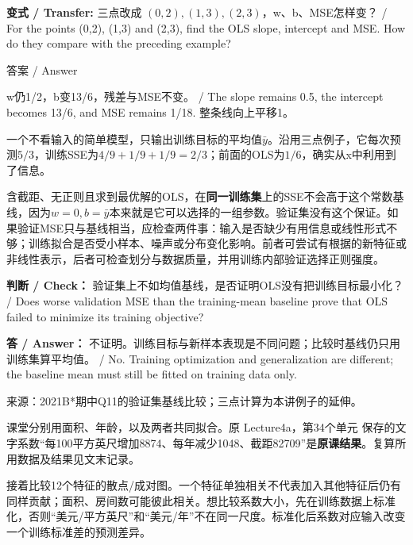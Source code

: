 \textbf{变式 / Transfer:} 三点改成 \((0,2),(1,3),(2,3)\)，w、b、MSE怎样变？ / For the points (0,2), (1,3) and (2,3), find the OLS slope, intercept and MSE. How do they compare with the preceding example?



\begin{StudySolution}{答案 / Answer}


w仍1/2，b变13/6，残差与MSE不变。 / The slope remains 0.5, the intercept becomes 13/6, and MSE remains 1/18. 整条线向上平移1。


\end{StudySolution}





一个不看输入的简单模型，只输出训练目标的平均值\(\bar y\)。沿用三点例子，它每次预测\(5/3\)，训练SSE为\(4/9+1/9+1/9=2/3\)；前面的OLS为\(1/6\)，确实从x中利用到了信息。


含截距、无正则且求到最优解的OLS，在\textbf{同一训练集}上的SSE不会高于这个常数基线，因为\(w=0,b=\bar y\)本来就是它可以选择的一组参数。验证集没有这个保证。如果验证MSE只与基线相当，应检查两件事：输入是否缺少有用信息或线性形式不够；训练拟合是否受小样本、噪声或分布变化影响。前者可尝试有根据的新特征或非线性表示，后者可检查划分与数据质量，并用训练内部验证选择正则强度。


\textbf{判断 / Check：} 验证集上不如均值基线，是否证明OLS没有把训练目标最小化？ / Does worse validation MSE than the training-mean baseline prove that OLS failed to minimize its training objective?


\textbf{答 / Answer：} 不证明。训练目标与新样本表现是不同问题；比较时基线仍只用训练集算平均值。 / No. Training optimization and generalization are different; the baseline mean must still be fitted on training data only.


来源：2021B*期中Q11的验证集基线比较；三点计算为本讲例子的延伸。





课堂分别用面积、年龄，以及两者共同拟合。原 Lecture4a，第34个单元 保存的文字系数“每100平方英尺增加8874、每年减少1048、截距82709”是\textbf{原课结果}。复算所用数据及结果见文末记录。


接着比较12个特征的散点/成对图。一个特征单独相关不代表加入其他特征后仍有同样贡献；面积、房间数可能彼此相关。想比较系数大小，先在训练数据上标准化，否则“美元/平方英尺”和“美元/年”不在同一尺度。标准化后系数对应输入改变一个训练标准差的预测差异。


